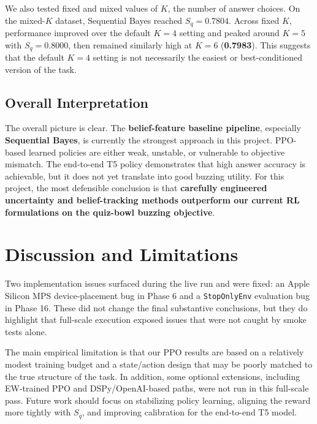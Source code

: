 \documentclass[11pt]{article}
\begin{document}
We also tested fixed and mixed values of $K$, the number of answer choices. On
the mixed-$K$ dataset, Sequential Bayes reached \textbf{$S_q = 0.7804$}.
Across fixed $K$, performance improved over the default $K=4$ setting and
peaked around \textbf{$K=5$} with \textbf{$S_q = 0.8000$}, then remained
similarly high at \textbf{$K=6$} (\textbf{0.7983}). This suggests that the
default $K=4$ setting is not necessarily the easiest or best-conditioned
version of the task.

\subsection{Overall Interpretation}

The overall picture is clear. The \textbf{belief-feature baseline pipeline},
especially \textbf{Sequential Bayes}, is currently the strongest approach in
this project. PPO-based learned policies are either weak, unstable, or
vulnerable to objective mismatch. The end-to-end T5 policy demonstrates that
high answer accuracy is achievable, but it does not yet translate into good
buzzing utility. For this project, the most defensible conclusion is that
\textbf{carefully engineered uncertainty and belief-tracking methods outperform
our current RL formulations on the quiz-bowl buzzing objective}.

\section{Discussion and Limitations}

Two implementation issues surfaced during the live run and were fixed: an Apple
Silicon MPS device-placement bug in Phase 6 and a \texttt{StopOnlyEnv}
evaluation bug in Phase 16. These did not change the final substantive
conclusions, but they do highlight that full-scale execution exposed issues
that were not caught by smoke tests alone.

The main empirical limitation is that our PPO results are based on a relatively
modest training budget and a state/action design that may be poorly matched to
the true structure of the task. In addition, some optional extensions,
including EW-trained PPO and DSPy/OpenAI-based paths, were not run in this
full-scale pass. Future work should focus on stabilizing policy learning,
aligning the reward more tightly with $S_q$, and improving calibration for the
end-to-end T5 model.
\end{document}
